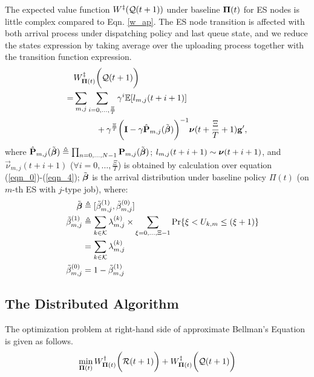 The expected value function $W^{\ddagger}(\mathcal{Q}({t+1}))$ under baseline $\boldsymbol{\Pi}({t})$ for ES nodes is little complex compared to Eqn. \ref{w_ap}.
The ES node transition is affected with both arrival process under dispatching policy and last queue state, and we reduce the states expression by taking average over the uploading process together with the transition function expression.
\begin{align}
    &W^{\ddagger}_{\boldsymbol{\Pi}({t})}\bigg(\mathcal{Q}({t+1})\bigg)
    \nonumber\\
    =& \sum_{m,j}\sum_{i=0,\dots,\frac{\Xi}{T}} \gamma^{i} \mathbb{E}[ l_{m,j}({t+i+1}) ]
    \nonumber\\
    &~~~~~~~~+ \gamma^{\frac{\Xi}{T}} \bigg( \mathbf{I} - \gamma \hat{\mathbf{P}}_{m,j}(\tilde{\boldsymbol{\beta}}) \bigg)^{-1} \boldsymbol{\nu}({t+\frac{\Xi}{T}+1}) \mathbf{g}',
\end{align}
where $\hat{\mathbf{P}}_{m,j}(\tilde{\boldsymbol{\beta}}) \triangleq \prod_{n=0,\dots,N-1} \mathbf{P}_{m,j}(\tilde{\boldsymbol{\beta}})$;
$l_{m,j}({t+i+1}) \sim \boldsymbol{\nu}({t+i+1})$, and $\vec{\nu}_{m,j}({t+i+1})$ ($\forall i=0,\dots,\frac{\Xi}{T}$) is obtained by calculation over equation (\ref{eqn_0})-(\ref{eqn_4});
$\tilde{\boldsymbol{\beta}}$ is the arrival distribution under baseline policy $\Pi({t})$ (on $m$-th ES with $j$-type job), where:
\begin{align}
    ~~~~\tilde{\boldsymbol{\beta}} &\triangleq [\tilde{\beta}^{(1)}_{m,j}, \tilde{\beta}^{(0)}_{m,j}]
    \\
    ~~~~\tilde{\beta}^{(1)}_{m,j} &\triangleq \sum_{k\in\mathcal{K}} \lambda^{(k)}_{m,j} \times \sum_{\xi=0,\dots,\Xi-1} \Pr\{ \xi<U_{k,m}\leq(\xi+1) \}
        \nonumber\\
    ~~~~&= \sum_{k\in\mathcal{K}} \lambda^{(k)}_{m,j}
    \\
    ~~~~\tilde{\beta}^{(0)}_{m,j} &= 1 - \tilde{\beta}^{(1)}_{m,j}
\end{align}

\subsection{The Distributed Algorithm}
The optimization problem at right-hand side of approximate Bellman's Equation is given as follows.
\begin{align}
    \min_{\boldsymbol{\Pi}({t})} W^{\dagger}_{\boldsymbol{\Pi}({t})}\bigg(\mathcal{R}({t+1})\bigg) + W^{\ddagger}_{\boldsymbol{\Pi}({t})}\bigg(\mathcal{Q}({t+1})\bigg)
    \label{eqn_opt}
\end{align}

